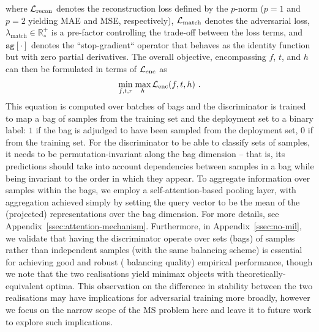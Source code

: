 %
where \( {\mathcal{L}}_{\text{recon}} \) denotes the reconstruction loss defined by the \(p\)-norm (\(p=1\)
and \(p=2\) yielding MAE and MSE, respectively), \( {\mathcal{L}}_\text{match} \) denotes the adversarial loss,
\( \lambda_\text{match} \in \mathbb{R}^+_\ast \) is a pre-factor controlling the trade-off between
the loss terms, and \( \texttt{sg}[\cdot] \) denotes the ``stop-gradient`` operator that behaves as
the identity function but with zero partial derivatives.
%
The overall objective, encompassing $f$, $t$, and $h$ can then be formulated in terms of
\( {\mathcal{L}}_\text{enc} \) as
%
\begin{align}
    \underset{f, t, r}{\textrm{min}}\; \underset{h}{\textrm{max}}\,{\mathcal{L}}_\text{enc}(f, t, h)~.
    \label{eq:disentangling_total}
\end{align}
%
This equation is computed over batches of bags and the discriminator is trained to map a bag of
samples from the training set and the deployment set to a binary label: $1$ if the bag is adjudged to
have been sampled from the deployment set, $0$ if from the training set.
For the discriminator to be able to classify sets of samples, it needs to be permutation-invariant
along the bag dimension -- that is, its predictions should take into account dependencies between
samples in a bag while being invariant to the order in which they appear. 
To aggregate information over samples within the bags, we employ a self-attention-based
\citep{vaswani2017attention} pooling layer, with aggregation achieved simply by setting the query
vector to be the mean of the (projected) representations over the bag dimension.
%
For more details, see Appendix~\ref{ssec:attention-mechanism}. 
%
Furthermore, in Appendix~\ref{ssec:no-mil}, we validate that having the discriminator operate over
sets (bags) of samples rather than independent samples (with the same balancing scheme) is
essential for achieving good and robust (\wrt{} balancing quality) empirical performance,
though we note that the two realisations yield minimax objects with theoretically-equivalent optima.
%
This observation on the difference in stability between the two realisations may have implications
for adversarial training more broadly, however we focus on the narrow scope of the \ac{MS} problem
here and leave it to future work to explore such implications.

